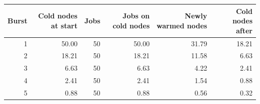 \begin{tabular}{rrrrrr}
\toprule
Burst & Cold nodes at start & Jobs & Jobs on cold nodes & Newly warmed nodes & Cold nodes after \\
\midrule
1 & 50.00 & 50 & 50.00 & 31.79 & 18.21 \\
2 & 18.21 & 50 & 18.21 & 11.58 & 6.63 \\
3 & 6.63 & 50 & 6.63 & 4.22 & 2.41 \\
4 & 2.41 & 50 & 2.41 & 1.54 & 0.88 \\
5 & 0.88 & 50 & 0.88 & 0.56 & 0.32 \\
\bottomrule
\end{tabular}
